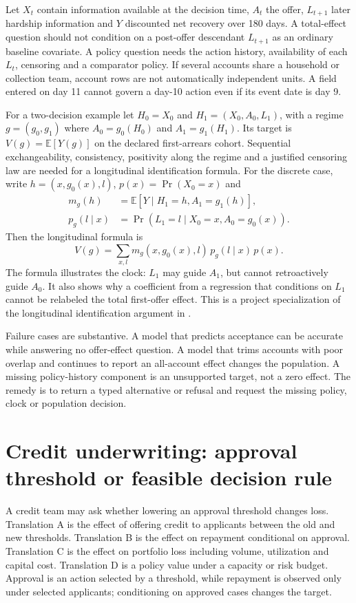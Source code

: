 Let $X_t$ contain information available at the decision time, $A_t$ the offer, $L_{t+1}$ later hardship information and $Y$ discounted net recovery over 180 days. A total-effect question should not condition on a post-offer descendant $L_{t+1}$ as an ordinary baseline covariate. A policy question needs the action history, availability of each $L_t$, censoring and a comparator policy. If several accounts share a household or collection team, account rows are not automatically independent units. A field entered on day 11 cannot govern a day-10 action even if its event date is day 9.

For a two-decision example let $H_0=X_0$ and $H_1=(X_0,A_0,L_1)$, with a regime $g=(g_0,g_1)$ where $A_0=g_0(H_0)$ and $A_1=g_1(H_1)$. Its target is $V(g)=\mathbb E[Y(g)]$ on the declared first-arrears cohort. Sequential exchangeability, consistency, positivity along the regime and a justified censoring law are needed for a longitudinal identification formula. For the discrete case, write $h=(x,g_0(x),l)$, $p(x)=\Pr(X_0=x)$ and
\begin{align*}
 m_g(h)&=\mathbb E[Y\mid H_1=h,A_1=g_1(h)],\\
 p_g(l\mid x)&=\Pr(L_1=l\mid X_0=x,A_0=g_0(x)).
\end{align*}
Then the longitudinal formula is
\[
 V(g)=\sum_{x,l}m_g(x,g_0(x),l)\,p_g(l\mid x)\,p(x).
\]
The formula illustrates the clock: $L_1$ may guide $A_1$, but cannot retroactively guide $A_0$. It also shows why a coefficient from a regression that conditions on $L_1$ cannot be relabeled the total first-offer effect. This is a project specialization of the longitudinal identification argument in \citet{hernan2020}.

Failure cases are substantive. A model that predicts acceptance can be accurate while answering no offer-effect question. A model that trims accounts with poor overlap and continues to report an all-account effect changes the population. A missing policy-history component is an unsupported target, not a zero effect. The remedy is to return a typed alternative or refusal and request the missing policy, clock or population decision.

\section{Credit underwriting: approval threshold or feasible decision rule}

A credit team may ask whether lowering an approval threshold changes loss. Translation A is the effect of offering credit to applicants between the old and new thresholds. Translation B is the effect on repayment conditional on approval. Translation C is the effect on portfolio loss including volume, utilization and capital cost. Translation D is a policy value under a capacity or risk budget. Approval is an action selected by a threshold, while repayment is observed only under selected applicants; conditioning on approved cases changes the target.

